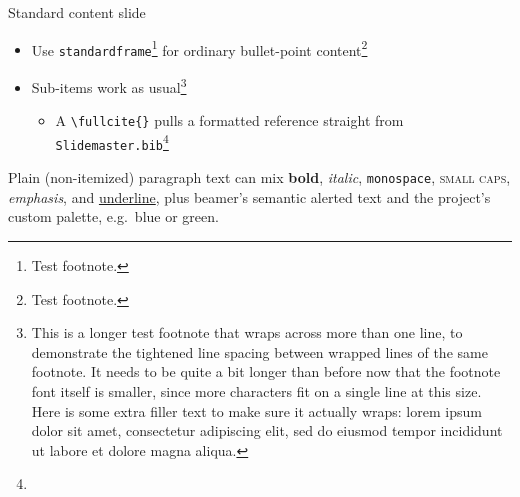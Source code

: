 %

\begin{standardframe}{Standard content slide}
	\begin{itemize}
		\item Use \texttt{standardframe}\footnote{Test footnote.} for ordinary bullet-point content\footnote{Test footnote.}
		\item Sub-items work as usual\footnote{This is a longer test footnote that wraps across more than one line, to demonstrate the tightened line spacing between wrapped lines of the same footnote. It needs to be quite a bit longer than before now that the footnote font itself is smaller, since more characters fit on a single line at this size. Here is some extra filler text to make sure it actually wraps: lorem ipsum dolor sit amet, consectetur adipiscing elit, sed do eiusmod tempor incididunt ut labore et dolore magna aliqua.}
		\begin{itemize}
			\item A \texttt{\textbackslash fullcite\{\}} pulls a formatted reference straight from \texttt{Slidemaster.bib}\footnote{}
		\end{itemize}
	\end{itemize}

	\vspace{1em}
	\noindent Plain (non-itemized) paragraph text can mix \textbf{bold},
	\textit{italic}, \texttt{monospace}, \textsc{small caps}, \emph{emphasis},
	and \underline{underline}, plus beamer's semantic \alert{alerted text}
	and the project's custom palette, e.g.\
	\textcolor{c_secondary_blue}{blue} or
	\textcolor{c_secondary_green}{green}.
\end{standardframe}
